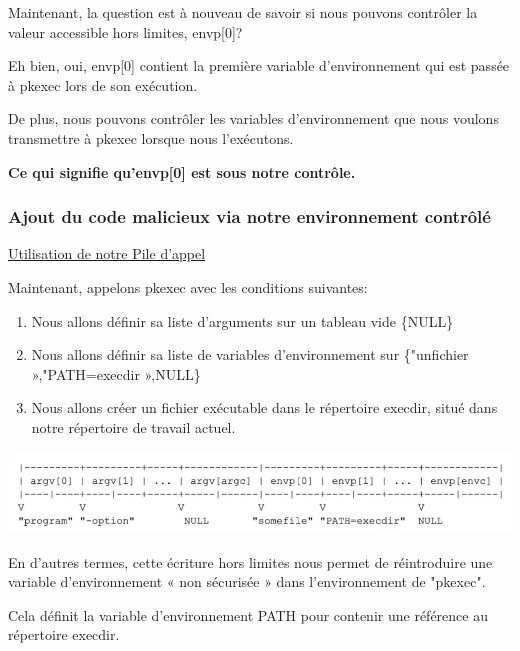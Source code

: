 \documentclass[12pt,a4paper]{article}
\begin{document}
\begin{flushleft}
                \item Maintenant, la question est à nouveau de savoir si nous pouvons contrôler la valeur accessible hors limites, envp[0]? 
                \item Eh bien, oui, envp[0] contient la première variable d’environnement qui est passée à pkexec lors de son exécution. 
                \item De plus, nous pouvons contrôler les variables d’environnement que nous voulons transmettre à pkexec lorsque nous l’exécutons. 
                \item \textbf{Ce qui signifie qu'envp[0] est sous notre contrôle.}
                \subsubsection{Ajout du code malicieux via notre environnement contrôlé}
                \item \underline{Utilisation de notre Pile d'appel}
                     \item Maintenant, appelons pkexec avec les conditions suivantes:
                     \begin{enumerate}
                         \item Nous allons définir sa liste d’arguments sur un tableau vide \{NULL\}
                         \item Nous allons définir sa liste de variables d’environnement sur \{"unfichier »,"PATH=execdir »,NULL\}
                         \item Nous allons créer un fichier exécutable dans le répertoire execdir, situé dans notre répertoire de travail actuel.
                     \end{enumerate}
                 \begin{center}
                    \includegraphics[scale=0.4]{image} \cite{CVE2021425:online}
                 \end{center}
                \item En d'autres termes, cette écriture hors limites nous permet de réintroduire une variable d’environnement « non sécurisée » dans l'environnement de "pkexec".
                \item Cela définit la variable d’environnement PATH pour contenir une référence au répertoire execdir. 

\end{flushleft}
\end{document}
